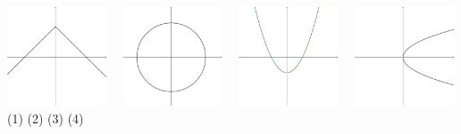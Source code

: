 \documentclass{oblivoir}
\begin{document}
%
\label{graph5}
\begin{center}
\includegraphics[width=0.22\textwidth]{graph_5-1}~~
\includegraphics[width=0.22\textwidth]{graph_5-2}~~
\includegraphics[width=0.22\textwidth]{graph_5-3}~~
\includegraphics[width=0.22\textwidth]{graph_5-4}\\
(1)
\qquad\qquad\qquad\quad
(2)
\qquad\qquad\qquad\quad
(3)
\qquad\qquad\qquad\quad
(4)
\end{center}

\end{document}

